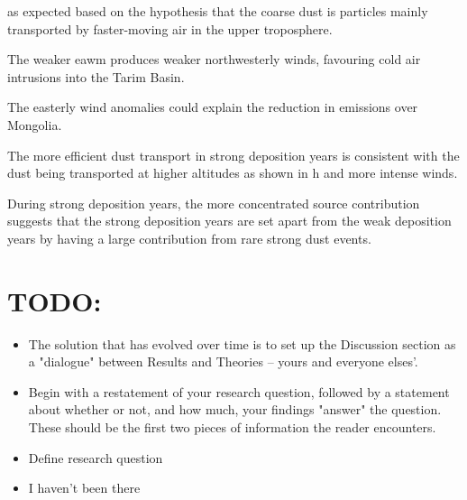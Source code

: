 as expected based on the hypothesis that the coarse dust is particles mainly transported by faster-moving air in the upper troposphere.

The weaker \acrshort{eawm} produces weaker northwesterly winds, favouring cold air intrusions into the Tarim Basin.  

The easterly wind anomalies could explain the reduction in emissions over Mongolia. 

The more efficient dust transport in strong deposition years is consistent with the dust being transported at higher altitudes as shown in h and more intense winds.

During strong deposition years, the more concentrated source contribution suggests that the strong deposition years are set apart from the weak deposition years by having a large contribution from rare strong dust events. 

\section{TODO:}


\begin{itemize}
    \item The solution that has evolved over time is to set up the Discussion section as a "dialogue" between Results and Theories -- yours and everyone elses'. 
    \item Begin with a restatement of your research question, followed by a statement about whether or not, and how much, your findings "answer" the question.  These should be the first two pieces of information the reader encounters.
    \item Define research question
    \item I haven't been there
\end{itemize}



\section{}

